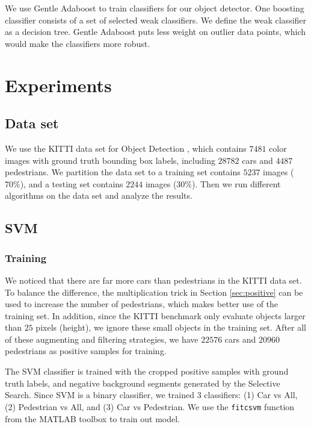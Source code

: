 \documentclass{article} %
\begin{document}
We use Gentle Adaboost \cite{Torralba04sharingfeatures:} to train classifiers for our object detector. One boosting classifier consists of a set of selected weak classifiers. We define the weak classifier as a decision tree. Gentle Adaboost puts less weight on outlier data points, which would make the classifiers more robust.

\section{Experiments}

\subsection{Data set}

We use the KITTI data set for Object Detection \cite{Geiger2012CVPR}, which contains $7481$ color images with ground truth bounding box labels, including $28782$ cars and $4487$ pedestrians. We partition the data set to a training set contains $5237$ images ($70\%$), and a testing set contains $2244$ images ($30\%$). Then we run different algorithms on the data set and analyze the results.

\subsection{SVM}

\subsubsection{Training}

We noticed that there are far more cars than pedestrians in the KITTI data set. To balance the difference, the multiplication trick in Section \ref{sec:positive} can be used to increase the number of pedestrians, which makes better use of the training set. In addition, since the KITTI benchmark only evaluate objects larger than $25$ pixels (height), we ignore these small objects in the training set. After all of these augmenting and filtering strategies, we have $22576$ cars and $20960$ pedestrians as positive samples for training.

The SVM classifier is trained with the cropped positive samples with ground truth labels, and negative background segments generated by the Selective Search. Since SVM is a binary classifier, we trained 3 classifiers: (1) Car vs All, (2) Pedestrian vs All, and (3) Car vs Pedestrian. We use the \texttt{fitcsvm} function from the MATLAB toolbox to train out model.
\end{document}
